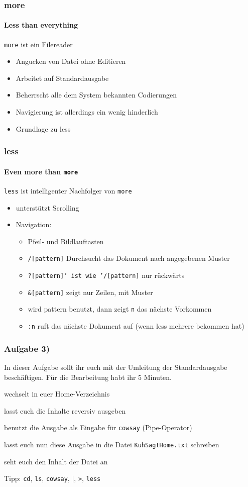 \documentclass[12pt,utf8, handout]{beamer}
\begin{document}
\begin{frame}
\frametitle{more}
\framesubtitle{\textcolor{ownDarkOr}{Less than everything}}
\texttt{more} ist ein Filereader
\begin{itemize}
	\item Angucken von Datei ohne Editieren
	\item Arbeitet auf Standardausgabe
	\item Beherrscht alle dem System bekannten Codierungen
	\item Navigierung ist allerdings ein wenig hinderlich
	\item Grundlage zu less
\end{itemize}
\end{frame}

\begin{frame}
\frametitle{less}
\framesubtitle{\textcolor{ownDarkOr}{Even more than \texttt{more}}}
\texttt{less} ist intelligenter Nachfolger von \texttt{more}
\begin{itemize}
	\item unterstützt Scrolling
	\item Navigation:
	\begin{itemize}[<+->]
		\item Pfeil- und Bildlauftasten
		\item \texttt{/[pattern]} Durchsucht das Dokument nach angegebenen Muster
		\item \texttt{?[pattern]' ist wie '/[pattern]} nur rückwärts
		\item \texttt{\&[pattern]} zeigt nur Zeilen, mit Muster
		\item wird pattern benutzt, dann zeigt \texttt{n} das nächste Vorkommen
		\item \texttt{:n} ruft das nächste Dokument auf (wenn less mehrere bekommen hat)
	\end{itemize}
\end{itemize}
\end{frame}

\begin{frame}
\frametitle{Aufgabe 3)}
In dieser Aufgabe sollt ihr euch mit der Umleitung der Standardausgabe beschäftigen. Für die Bearbeitung habt ihr 5 Minuten.
\begin{itemize}
	{\footnotesize
	\item wechselt in euer Home-Verzeichnis
	\item lasst euch die Inhalte reversiv ausgeben
	\item benutzt die Ausgabe als Eingabe für \texttt{cowsay} (Pipe-Operator)
	\item lasst euch nun diese Ausgabe in die Datei \texttt{KuhSagtHome.txt} schreiben
	\item seht euch den Inhalt der Datei an
	}
\end{itemize}
{\scriptsize Tipp: \texttt{cd}, \texttt{ls}, \texttt{cowsay}, \texttt{$\mid$}, \texttt{>}, \texttt{less}}
\end{frame}
\end{document}
